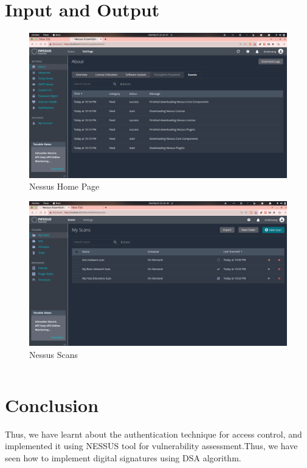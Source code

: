 \documentclass[openany]{book}
\begin{document}
\section{Input and Output}
\begin{figure}[H]
    \centering
    \includegraphics[width=.95\textwidth]{nessus 1.png}
    \caption{Nessus Home Page}
\end{figure}
\begin{figure}[H]
    \centering
    \includegraphics[width=.95\textwidth]{nessus 2.png}
    \caption{Nessus Scans}
\end{figure}
\begin{verbatim}
\end{verbatim}


% 

\section{Conclusion}
Thus, we have learnt about the authentication technique for access control, and implemented it using NESSUS tool for vulnerability assessment.Thus, we have seen how to implement digital signatures using DSA algorithm.
\clearpage
\end{document}
